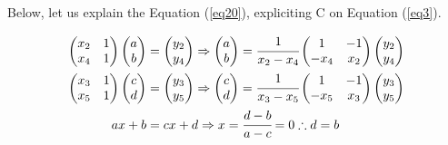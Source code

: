\newpage

Below, let us explain the Equation (\ref{eq20}), expliciting C on Equation (\ref{eq3}).

\begin{align}
    \begin{pmatrix}
        x_2 & 1 \\ x_4 & 1
    \end{pmatrix}  
    \begin{pmatrix}
        a \\ b
    \end{pmatrix} &=
    \begin{pmatrix}
        y_2 \\ y_4
    \end{pmatrix} \Rightarrow 
    \begin{pmatrix}
        a \\ b
    \end{pmatrix} = \cfrac{1}{x_2 - x_4}
    \begin{pmatrix}
        1 & -1 \\ -x_4 & x_2
    \end{pmatrix}  
    \begin{pmatrix}
        y_2 \\ y_4
    \end{pmatrix} \\
    \begin{pmatrix}
        x_3 & 1 \\ x_5 & 1
    \end{pmatrix}  
    \begin{pmatrix}
        c \\ d
    \end{pmatrix} &=
    \begin{pmatrix}
        y_3 \\ y_5
    \end{pmatrix} \Rightarrow 
    \begin{pmatrix}
        c \\ d
    \end{pmatrix} = \cfrac{1}{x_3 - x_5}
    \begin{pmatrix}
        1 & -1 \\ -x_5 & x_3
    \end{pmatrix}  
    \begin{pmatrix}
        y_3 \\ y_5
    \end{pmatrix} \\
    ax + b &= cx + d \Rightarrow x = \cfrac{d-b}{a-c} = 0 \therefore d = b
\end{align}

